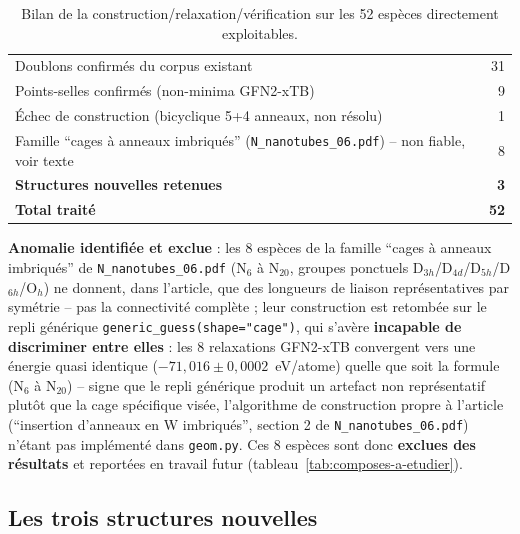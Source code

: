 \documentclass[11pt,a4paper]{article}
\begin{document}
\begin{table}[H]
\centering
\begin{tabular}{lr}
\toprule
Doublons confirm\'es du corpus existant & 31 \\
Points-selles confirm\'es (non-minima GFN2-xTB) & 9 \\
\'Echec de construction (bicyclique 5+4 anneaux, non r\'esolu) & 1 \\
Famille ``cages \`a anneaux imbriqu\'es'' (\texttt{N\_nanotubes\_06.pdf}) -- non fiable, voir texte & 8 \\
\textbf{Structures nouvelles retenues} & \textbf{3} \\
\midrule
\textbf{Total trait\'e} & \textbf{52} \\
\bottomrule
\end{tabular}
\caption{Bilan de la construction/relaxation/v\'erification sur les 52
esp\`eces directement exploitables.}
\label{tab:archive-build-results}
\end{table}

\textbf{Anomalie identifi\'ee et exclue} : les 8 esp\`eces de la famille
``cages \`a anneaux imbriqu\'es'' de \texttt{N\_nanotubes\_06.pdf} (N$_6$
\`a N$_{20}$, groupes ponctuels D$_{3h}$/D$_{4d}$/D$_{5h}$/D$_{6h}$/O$_h$)
ne donnent, dans l'article, que des longueurs de liaison
repr\'esentatives par sym\'etrie -- pas la connectivit\'e compl\`ete ; leur
construction est retomb\'ee sur le repli g\'en\'erique
\texttt{generic\_guess(shape="cage")}, qui s'av\`ere \textbf{incapable de
discriminer entre elles} : les 8 relaxations GFN2-xTB convergent vers une
\'energie quasi identique ($-71{,}016 \pm 0{,}0002$~eV/atome) quelle que
soit la formule (N$_6$ \`a N$_{20}$) -- signe que le repli g\'en\'erique
produit un artefact non repr\'esentatif plut\^ot que la cage sp\'ecifique
vis\'ee, l'algorithme de construction propre \`a l'article
(``insertion d'anneaux en W imbriqu\'es'', section 2 de
\texttt{N\_nanotubes\_06.pdf}) n'\'etant pas impl\'ement\'e dans
\texttt{geom.py}. Ces 8 esp\`eces sont donc \textbf{exclues des r\'esultats}
et report\'ees en travail futur (tableau~\ref{tab:composes-a-etudier}).

\subsection{Les trois structures nouvelles}
\end{document}

